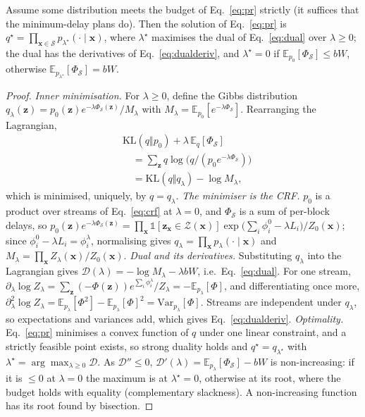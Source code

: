 \begin{proposition}
\label{prop:pr}
Assume some distribution meets the budget of Eq.~\eqref{eq:pr} strictly (it suffices that the minimum-delay plans do).
Then the solution of Eq.~\eqref{eq:pr} is $q^\star=\prod_{\bm{x}\in\mathcal{S}}p_{\lambda^\star}(\cdot\mid\bm{x})$, where
$\lambda^\star$ maximises the dual of Eq.~\eqref{eq:dual} over $\lambda\ge0$; the dual has the derivatives of
Eq.~\eqref{eq:dualderiv}, and $\lambda^\star=0$ if $\mathbb{E}_{p_0}[\Phi_\mathcal{S}]\le bW$, otherwise
$\mathbb{E}_{p_{\lambda^\star}}[\Phi_\mathcal{S}]=bW$.
\end{proposition}

\begin{proof}
\emph{Inner minimisation.} For $\lambda\ge0$, define the Gibbs distribution
$q_\lambda(\bm{z})=p_0(\bm{z})e^{-\lambda\Phi_\mathcal{S}(\bm{z})}/M_\lambda$ with $M_\lambda=\mathbb{E}_{p_0}[e^{-\lambda\Phi_\mathcal{S}}]$.
Rearranging the Lagrangian,
\[
\begin{aligned}
&\mathrm{KL}(q\Vert p_0)+\lambda\,\mathbb{E}_q[\Phi_\mathcal{S}]\\
&\quad=\textstyle\sum_{\bm{z}}q\log\big(q/(p_0e^{-\lambda\Phi_\mathcal{S}})\big)\\
&\quad=\mathrm{KL}(q\Vert q_\lambda)-\log M_\lambda ,
\end{aligned}
\]
which is minimised, uniquely, by $q=q_\lambda$.
\emph{The minimiser is the CRF.} $p_0$ is a product over streams of Eq.~\eqref{eq:crf} at $\lambda=0$, and
$\Phi_\mathcal{S}$ is a sum of per-block delays, so
$p_0(\bm{z})e^{-\lambda\Phi_\mathcal{S}(\bm{z})}=\prod_{\bm{x}}\mathds{1}[\bm{z}_{\bm{x}}\in\mathcal{Z}(\bm{x})]\exp\big(\sum_i\phi^0_i-\lambda L_i\big)/Z_0(\bm{x})$;
since $\phi^0_i-\lambda L_i=\phi^\lambda_i$, normalising gives $q_\lambda=\prod_{\bm{x}}p_\lambda(\cdot\mid\bm{x})$ and
$M_\lambda=\prod_{\bm{x}}Z_\lambda(\bm{x})/Z_0(\bm{x})$.
\emph{Dual and its derivatives.} Substituting $q_\lambda$ into the Lagrangian gives
$\mathcal{D}(\lambda)=-\log M_\lambda-\lambda bW$, i.e.\ Eq.~\eqref{eq:dual}. For one stream,
$\partial_\lambda\log Z_\lambda=\sum_{\bm{z}}(-\Phi(\bm{z}))e^{\sum_i\phi^\lambda_i}/Z_\lambda=-\mathbb{E}_{p_\lambda}[\Phi]$, and
differentiating once more, $\partial^2_\lambda\log Z_\lambda=\mathbb{E}_{p_\lambda}[\Phi^2]-\mathbb{E}_{p_\lambda}[\Phi]^2=\mathrm{Var}_{p_\lambda}[\Phi]$.
Streams are independent under $q_\lambda$, so expectations and variances add, which gives Eq.~\eqref{eq:dualderiv}.
\emph{Optimality.} Eq.~\eqref{eq:pr} minimises a convex function of $q$ under one linear constraint, and a strictly
feasible point exists, so strong duality holds and $q^\star=q_{\lambda^\star}$ with $\lambda^\star=\arg\max_{\lambda\ge0}\mathcal{D}$.
As $\mathcal{D}''\le0$, $\mathcal{D}'(\lambda)=\mathbb{E}_{p_\lambda}[\Phi_\mathcal{S}]-bW$ is non-increasing: if it is
$\le0$ at $\lambda=0$ the maximum is at $\lambda^\star=0$, otherwise at its root, where the budget holds with equality
(complementary slackness). A non-increasing function has its root found by bisection.
\end{proof}

